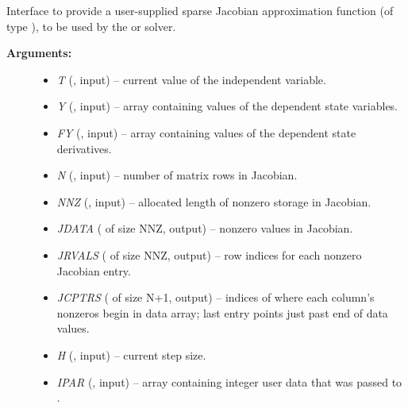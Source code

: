 \documentclass[letterpaper,10pt,english]{sphinxmanual}
\begin{document}
\begin{fulllineitems}
\label{f_interface/Usage:f/_/FARKSPJAC}
Interface to provide a user-supplied sparse Jacobian approximation
function (of type {\hyperref[c_interface/User_supplied:c.ARKSlsSparseJacFn]{\emph{}}}), to be used by the
{\hyperref[f_interface/Usage:f/_/FARKKLU]{\emph{}}} or {\hyperref[f_interface/Usage:f/_/FARKSUPERLUMT]{\emph{}}} solver.
\begin{description}
\item[{\textbf{Arguments:}}] \leavevmode\begin{itemize}
\item {} 
\emph{T} (, input) -- current value of the independent variable.

\item {} 
\emph{Y} (, input) -- array containing values of the dependent state variables.

\item {} 
\emph{FY} (, input) -- array containing values of the dependent state derivatives.

\item {} 
\emph{N} (, input) -- number of matrix rows in Jacobian.

\item {} 
\emph{NNZ} (, input) -- allocated length of nonzero storage in Jacobian.

\item {} 
\emph{JDATA} ( of size NNZ, output) -- nonzero values in Jacobian.

\item {} 
\emph{JRVALS} ( of size NNZ, output) -- row indices for each
nonzero Jacobian entry.

\item {} 
\emph{JCPTRS} ( of size N+1, output) -- indices of where
each column's nonzeros begin in data array; last entry points
just past end of data values.

\item {} 
\emph{H} (, input) -- current step size.

\item {} 
\emph{IPAR} (, input) -- array containing integer user data that was passed to
{\hyperref[f_interface/Usage:f/_/FARKMALLOC]{\emph{}}}.


\end{itemize}
\end{description}
\end{fulllineitems}
\end{document}
